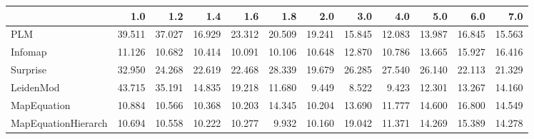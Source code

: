 \begin{tabular}{lrrrrrrrrrrr}
\toprule
{} &    1.0 &    1.2 &    1.4 &    1.6 &    1.8 &    2.0 &    3.0 &    4.0 &    5.0 &    6.0 &    7.0 \\
\midrule
PLM                 & 39.511 & 37.027 & 16.929 & 23.312 & 20.509 & 19.241 & 15.845 & 12.083 & 13.987 & 16.845 & 15.563 \\
Infomap             & 11.126 & 10.682 & 10.414 & 10.091 & 10.106 & 10.648 & 12.870 & 10.786 & 13.665 & 15.927 & 16.416 \\
Surprise            & 32.950 & 24.268 & 22.619 & 22.468 & 28.339 & 19.679 & 26.285 & 27.540 & 26.140 & 22.113 & 21.329 \\
LeidenMod           & 43.715 & 35.191 & 14.835 & 19.218 & 11.680 &  9.449 &  8.522 &  9.423 & 12.301 & 13.267 & 14.160 \\
MapEquation         & 10.884 & 10.566 & 10.368 & 10.203 & 14.345 & 10.204 & 13.690 & 11.777 & 14.600 & 16.800 & 14.549 \\
MapEquationHierarch & 10.694 & 10.558 & 10.222 & 10.277 &  9.932 & 10.160 & 19.042 & 11.371 & 14.269 & 15.389 & 14.278 \\
\bottomrule
\end{tabular}
